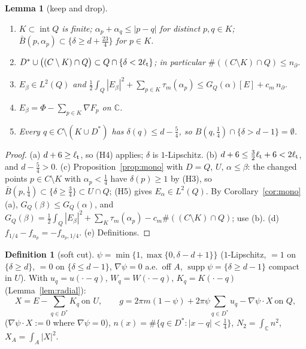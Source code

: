 \documentclass[11pt]{article}
\newtheorem{lemma}[theorem]{Lemma}
\theoremstyle{definition}
\newtheorem{definition}[theorem]{Definition}
\theoremstyle{remark}
\newcommand{\C}{\mathbb C}
\newcommand{\dep}{\delta}
\newcommand{\lt}{\ell_{\rm t}}
\DeclareMathOperator{\supp}{supp}
\begin{document}
\begin{lemma}[keep and drop]\label{lem:keep}
\begin{enumerate}[label=(\alph*)]
\item $K\subset\operatorname{int}Q$ is finite; $\alpha_p+\alpha_q\le|p-q|$ for distinct $p,q\in K$; $\bar B(p,\alpha_p)\subset\{\dep\ge d+\frac{23}4\}$ for $p\in K$.
\item $D^\ast\cup\bigl((C\setminus K)\cap Q\bigr)\subset Q\cap\{\dep<2\lt\}$; in particular $\#((C\setminus K)\cap Q)\le n_\partial$.
\item $E_\beta\in L^2(Q)$ and $\frac12\int_Q|E_\beta|^2+\sum_{p\in K}\tau_m(\alpha_p)\le G_Q(\alpha)[E]+c_m\,n_\partial$.
\item $E_\beta=\Phi-\sum_{p\in K}\nabla F_p$ on $\C$.
\item Every $q\in C\setminus(K\cup D^\ast)$ has $\dep(q)\le d-\frac54$, so $B(q,\frac14)\cap\{\dep>d-1\}=\emptyset$.
\end{enumerate}
\end{lemma}
\begin{proof}
(a) $d+6\ge\lt$, so (H4) applies; $\dep$ is $1$-Lipschitz. (b) $d+6\le\frac32\lt+6<2\lt$, and $d-\frac54>0$.
(c) Proposition~\ref{prop:mono} with $D=Q$, $U$, $\alpha\le\beta$: the changed points $p\in C\setminus K$ with $\alpha_p<\frac14$ have $\dep(p)\ge1$ by (H3), so
$\bar B(p,\frac14)\subset\{\dep\ge\frac34\}\subset U\cap Q$; (H5) gives $E_\alpha\in L^2(Q)$. By Corollary~\ref{cor:mono}(a), $G_Q(\beta)\le G_Q(\alpha)$, and
$G_Q(\beta)=\frac12\int_Q|E_\beta|^2+\sum_K\tau_m(\alpha_p)-c_m\#((C\setminus K)\cap Q)$; use (b).
(d) $f_{1/4}-f_{\alpha_p}=-f_{\alpha_p,1/4}$. (e) Definitions.
\end{proof}

\begin{definition}[soft cut]\label{def:soft}
$\psi=\min\{1,\max\{0,\dep-d+1\}\}$ ($1$-Lipschitz, $=1$ on $\{\dep\ge d\}$, $=0$ on $\{\dep\le d-1\}$, $\nabla\psi=0$ a.e.\ off $A$,
$\supp\psi=\{\dep\ge d-1\}$ compact in $U$). With $u_q=u(\cdot-q)$, $W_q=W(\cdot-q)$, $K_q=K(\cdot-q)$ (Lemma~\ref{lem:radial}):
\[
X=E-\sum_{q\in D^\ast}K_q\ \text{on }U,\qquad g=2\pi m(1-\psi)+2\pi\psi\sum_{q\in D^\ast}u_q-\nabla\psi\cdot X\ \text{on }Q,
\]
($\nabla\psi\cdot X:=0$ where $\nabla\psi=0$), $n(x)=\#\{q\in D^\ast:|x-q|<\frac14\}$, $N_2=\int_\C n^2$, $X_A=\int_A|X|^2$.
\end{definition}
\end{document}
